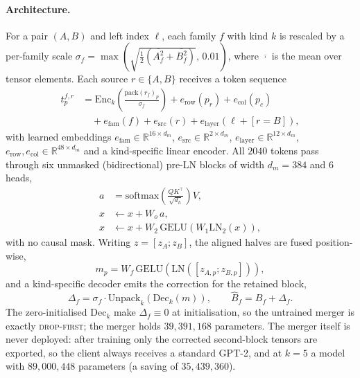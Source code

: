 \documentclass[10pt,a4paper]{article}
\newcommand{\dropfirst}{\textsc{drop-first}}
\begin{document}
\paragraph{Architecture.} For a pair $(A,B)$ and left index $\ell$, each family
$f$ with kind $k$ is rescaled by a per-family scale $\sigma_f =
\max(\sqrt{\tfrac{1}{2}(\overline{A_f^2}+\overline{B_f^2})},\,0.01)$, where
$\overline{\cdot}$ is the mean over tensor elements. Each source
$r\in\{A,B\}$ receives a token sequence
\begin{equation}
\begin{aligned}
t^{f,r}_p &= \mathrm{Enc}_k\!\left(\tfrac{\mathrm{pack}(r_f)_p}{\sigma_f}\right)
+ e_\text{row}(p_r) + e_\text{col}(p_c)\\
&\quad + e_\text{fam}(f) + e_\text{src}(r) + e_\text{layer}(\ell + [r=B]),
\end{aligned}
\end{equation}
with learned embeddings $e_\text{fam}\!\in\!\mathbb{R}^{16\times d_m}$,
$e_\text{src}\!\in\!\mathbb{R}^{2\times d_m}$,
$e_\text{layer}\!\in\!\mathbb{R}^{12\times d_m}$,
$e_\text{row},e_\text{col}\!\in\!\mathbb{R}^{48\times d_m}$ and a kind-specific
linear encoder. All $2040$ tokens pass through six unmasked (bidirectional)
pre-LN blocks of width $d_m=384$ and $6$ heads,
\begin{align}
a &= \mathrm{softmax}\!\left(\tfrac{QK^\top}{\sqrt{d_h}}\right)V, \\
x &\leftarrow x + W_o\,a, \\
x &\leftarrow x + W_2\,\mathrm{GELU}(W_1\mathrm{LN}_2(x)),
\end{align}
with no causal mask. Writing $z=[z_A;z_B]$, the aligned halves are fused
position-wise,
\begin{equation}
m_p = W_f\,\mathrm{GELU}\!\left(\mathrm{LN}([z_{A,p};z_{B,p}])\right),
\end{equation}
and a kind-specific decoder emits the correction for the retained block,
\begin{equation}
\Delta_f = \sigma_f \cdot \mathrm{Unpack}_k\!\left(\mathrm{Dec}_k(m)\right),
\qquad
\hat B_f = B_f + \Delta_f .
\end{equation}
The zero-initialised $\mathrm{Dec}_k$ make $\Delta_f\equiv 0$ at initialisation,
so the untrained merger is exactly \dropfirst{}; the merger holds $39{,}391{,}168$
parameters. The merger itself is never deployed: after training only the
corrected second-block tensors are exported, so the client always receives a
standard GPT-2, and at $k=5$ a model with $89{,}000{,}448$ parameters (a saving
of $35{,}439{,}360$).
\end{document}
